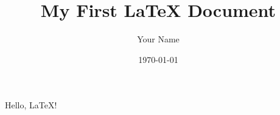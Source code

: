 \documentclass{article}
\title{My First \LaTeX{} Document}
\author{Your Name}
\date{\today}
\begin{document}
    \maketitle
    
    Hello, \LaTeX{}!
\end{document}
